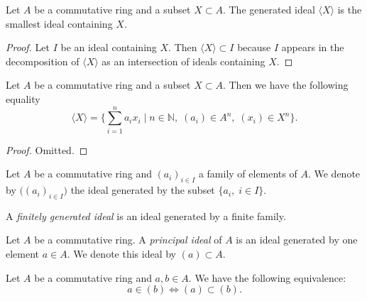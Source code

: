 \documentclass[12pt]{report}
\begin{document}
\begin{proposition} \label{prop-ring-ideal-generated-smallest}
    Let $A$ be a commutative ring and a subset $X \subset A$. The generated ideal $\langle X \rangle$ is the smallest ideal containing $X$.
\end{proposition}

\begin{proof}
    Let $I$ be an ideal containing $X$. Then $\langle X \rangle \subset I$ because $I$ appears in the decomposition of $\langle X \rangle$ as an intersection of ideals containing $X$.
\end{proof}

\begin{proposition} \label{prop-ring-ideal-generated-eq}
    Let $A$ be a commutative ring and a subset $X \subset A$. Then we have the following equality
    \[
        \langle X \rangle = \Big\lbrace \sum_{i = 1}^n a_i x_i \mid n \in \mathbb{N}, \; (a_i) \in A^n, \; (x_i) \in X^n \Big\rbrace.
    \]
\end{proposition}

\begin{proof}
    Omitted.
\end{proof}

\begin{notation} \label{not-ring-ideal-generated-by-family}
    Let $A$ be a commutative ring and $(a_i)_{i \in I}$ a family of elements of $A$. We denote by $\big( (a_i)_{i \in I} \big)$ the ideal generated by the subset $\lbrace a_i, \; i \in I \rbrace$.
\end{notation}

\begin{definition} \label{def-ring-ideal-finitely-generated}
    A \emph{finitely generated ideal} is an ideal generated by a finite family.
\end{definition}

\begin{definition} \label{def-ring-principal-ideal}
    Let $A$ be a commutative ring. A \emph{principal ideal} of $A$ is an ideal generated by one element $a \in A$. We denote this ideal by $(a) \subset A$.
\end{definition}

\begin{proposition} \label{prop-ring-principal-ideals-inclusion}
    Let $A$ be a commutative ring and $a, b \in A$. We have the following equivalence:
    \[
        a \in (b) \iff (a) \subset (b).
    \]  
\end{proposition}
\end{document}
